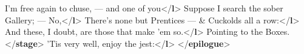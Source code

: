 \begin{shaded}
\hspace*{1em}\hspace*{1em}I'm free again to chuse, — and one of you{</\textbf{l}>}\mbox{}\newline 
\hspace*{1em}\mbox{}\newline 
\hspace*{1em}\mbox{}\newline 
\hspace*{1em}\hspace*{1em}Suppose I search the sober Gallery; — No,{</\textbf{l}>}\mbox{}\newline 
\hspace*{1em}\hspace*{1em}There's none but Prentices — \& Cuckolds all a row:{</\textbf{l}>}\mbox{}\newline 
\hspace*{1em}\hspace*{1em}And these, I doubt, are those that make 'em so.{</\textbf{l}>}\mbox{}\newline 
\hspace*{1em}\mbox{}\newline 
\hspace*{1em}Pointing to the Boxes.{</\textbf{stage}>}\mbox{}\newline 
\hspace*{1em}\mbox{}\newline 
\hspace*{1em}\hspace*{1em}'Tis very well, enjoy the jest:{</\textbf{l}>}\mbox{}\newline 
\hspace*{1em}\mbox{}\newline 
{}\mbox{}\newline 
{</\textbf{epilogue}>}\end{shaded}\egroup\par \noindent  \par
